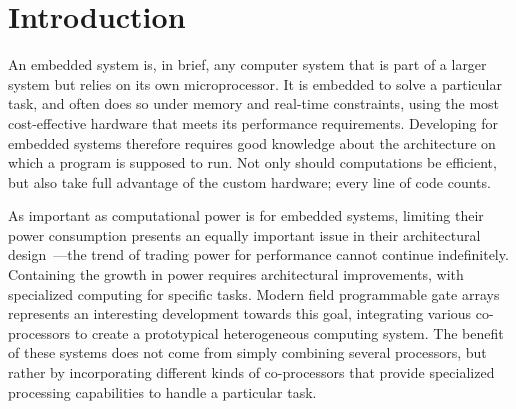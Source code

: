 \documentclass[../paper.tex]{subfiles}
\begin{document}
\chapter{Introduction}
\label{intro}

An embedded system is, in brief, any computer system that is part of a larger system but relies on its own microprocessor. It is embedded to solve a particular task, and often does so under memory and real-time constraints, using the most cost-effective hardware that meets its performance requirements. Developing for embedded systems therefore requires good knowledge about the architecture on which a program is supposed to run. Not only should computations be efficient, but also take full advantage of the custom hardware; every line of code counts.




As important as computational power is for embedded systems, limiting their power consumption presents an equally important issue in their architectural design~\cite{mudge2001}---the trend of trading power for performance cannot continue indefinitely. Containing the growth in power requires architectural improvements, with specialized computing for specific tasks. Modern field programmable gate arrays represents an interesting development towards this goal, integrating various co-processors to create a prototypical heterogeneous computing system. The benefit of these systems does not come from simply combining several processors, but rather by incorporating different kinds of co-processors that provide specialized processing capabilities to handle a particular task.
\end{document}
